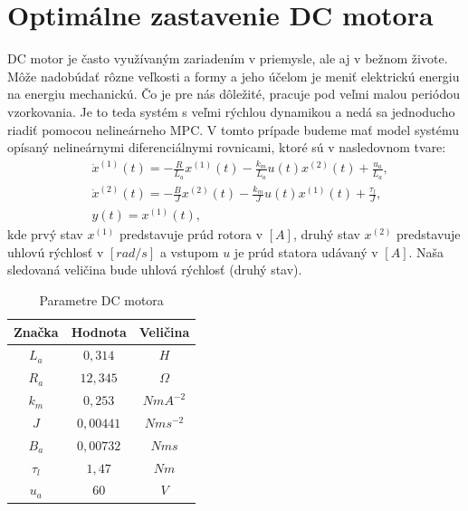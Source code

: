 \section{Optimálne zastavenie DC motora}

DC motor je často využívaným zariadením v priemysle, ale aj v bežnom živote. Môže nadobúdať rôzne veľkosti a formy a jeho účelom je meniť elektrickú energiu na energiu mechanickú. Čo je pre nás dôležité, pracuje pod veľmi malou periódou vzorkovania. Je to teda systém s veľmi rýchlou dynamikou a nedá sa jednoducho riadiť pomocou nelineárneho MPC. 
\label{math:model_DC}
V tomto prípade budeme mať model systému opísaný nelineárnymi diferenciálnymi rovnicami, ktoré sú v nasledovnom tvare:
\begin{subequations}
	\begin{align}
	& \dot{x}^{(1)}(t) = - \frac{R}{L_{a}}x^{(1)}(t) - \frac{k_{m}}{L_{a}}u(t)x^{(2)}(t) + \frac{u_a}{L_a},\\
	& \dot{x}^{(2)}(t) = - \frac{B}{J}x^{(2)}(t) - \frac{k_{m}}{J}u(t)x^{(1)}(t) + \frac{\tau_l}{J},\\
	& y(t) = x^{(1)}(t),
	\end{align}
\end{subequations}
kde prvý stav $x^{(1)}$ predstavuje prúd rotora v $[A]$, druhý stav $x^{(2)}$ predstavuje uhlovú rýchlosť v $[rad/s]$ a vstupom $u$ je prúd statora udávaný v $[A]$. Naša sledovaná veličina bude uhlová rýchlosť (druhý stav)\cite{bib2}.
\begin{table}[h!]
	\centering
	\caption{Parametre DC motora \cite{bib2}}
	\label{tab.1: Parametre DC motora}
	\begin{tabular}{c c c}
		\hline
		\textbf{Značka} & \textbf{Hodnota} & \textbf{Veličina} \\ \hline
		$L_{a}$ & $0,314$ & $H$ \\ 
		$R_{a}$ & $12,345$ & $\Omega$ \\ 
		$k_{m}$ & $0,253$ & $N m A^{-2}$ \\ 
		$J$ & $0,00441$ & $N m s^{-2}$ \\ 
		$B_{a}$ & $ 0,00732$ & $N m s$ \\ 
		$\tau_l$ & $1,47$ & $N m$ \\
		$u_{a}$ & $60$ & $V$ \\ \hline
	\end{tabular}
\end{table}

